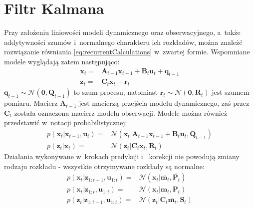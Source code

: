 \section{Filtr Kalmana} \label{KalmanFilter}
Przy założeniu liniowości modeli dynamicznego oraz obserwacyjnego, a~także addytywności szumów i~normalnego charakteru ich rozkładów, można znależć rozwiązanie równiania \ref{eq:recurrentCalculations} w~zwartej formie. Wspomniane modele wyglądają zatem następująco: \cite[56-57]{Sarka}
\begin{align}\label{eq:KalmanModels}
        \boldsymbol{x}_t = & \boldsymbol{A}_{t-1}\boldsymbol{x}_{t-1}+\boldsymbol{B}_{t}\boldsymbol{u}_{t}+\boldsymbol{q}_{t-1} \nonumber \\
        \boldsymbol{z}_t = & \boldsymbol{C}_{t}\boldsymbol{x}_{t}+\boldsymbol{r}_{t}
\end{align}
$\boldsymbol{q}_{t-1} \sim \mathcal{N}(\boldsymbol{0},\boldsymbol{Q}_{t-1})$ to szum procesu, natomiast $\boldsymbol{r}_{t} \sim \mathcal{N}(\boldsymbol{0},\boldsymbol{R}_{t})$ jest szumem pomiaru. Macierz $\boldsymbol{A}_{t-1}$ jest macierzą przejścia modelu dynamicznego, zaś przez $\boldsymbol{C}_t$ została oznaczona macierz modelu obserwacji. Modele można również przedstawić w~notacji probabilistycznej:
\begin{align}\label{eq:KalmanProbabilisticModels}
p(\boldsymbol{x}_t|\boldsymbol{x}_{t-1},\boldsymbol{u}_t)=&\mathcal{N}(\boldsymbol{x}_t|\boldsymbol{A}_{t-1}\boldsymbol{x}_{t-1}+\boldsymbol{B}_{t}\boldsymbol{u}_{t},\boldsymbol{Q}_{t-1}) \nonumber \\
p(\boldsymbol{z}_t|\boldsymbol{x}_{t})=&\mathcal{N}(\boldsymbol{z}_t|\boldsymbol{C}_{t}\boldsymbol{x}_{t},\boldsymbol{R}_{t})
\end{align}
Działania wykonywane w~krokach predykcji i ~korekcji nie powodują zmiany rodzaju rozkładu - wszystkie otrzymywane rozkłady są normalne:
\begin{align}\label{eq:KalmanDistributions}
p(\boldsymbol{x}_t|\boldsymbol{z}_{1:t-1},\boldsymbol{u}_{1:t})=&\mathcal{N}(\boldsymbol{x}_t|\bar{\boldsymbol{m}_{t}},\bar{\boldsymbol{P}_{t}}) \nonumber \\
p(\boldsymbol{x}_t|\boldsymbol{z}_{1:t},\boldsymbol{u}_{1:t})=&\mathcal{N}(\boldsymbol{x}_t|\boldsymbol{m}_{t},\boldsymbol{P}_{t}) \nonumber \\
p(\boldsymbol{z}_t|\boldsymbol{z}_{1:t-1},\boldsymbol{u}_{1:t})=&\mathcal{N}(\boldsymbol{z}_t|\boldsymbol{C}_t\bar{\boldsymbol{m}_{t}},\boldsymbol{S}_{t})
\end{align}
